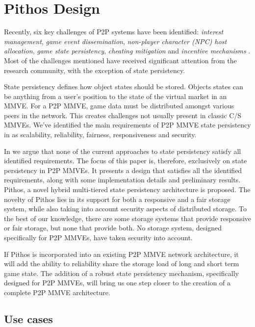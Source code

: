\chapter{Pithos Design}
\label{chp:DESIGN}

Recently, six key challenges of P2P systems have been identified: \emph{interest management}, \emph{game event dissemination}, \emph{non-player
character (NPC) host allocation}, \emph{game state persistency}, \emph{cheating mitigation} and \emph{incentive mechanisms}
\cite{Fan_deisgn_issues_p2p}. Most of the challenges mentioned have received significant attention from the research community, with the exception of
state persistency.

State persistency defines how object states should be stored. Objects states can be anything from a user's position to the state of the virtual
market in an MMVE. For a P2P MMVE, game data must be distributed amongst various peers in the network. This creates challenges not usually present in
classic C/S MMVEs. We've identified the main requirements of P2P MMVE state persistency in \cite{gilmore_p2p_mmog_state_persistency} as scalability,
reliability, fairness, responsiveness and security.

In \cite{gilmore_p2p_mmog_state_persistency} we argue that none of the current approaches to state persistency satisfy all identified requirements.
The focus of this paper is, therefore, exclusively on state persistency in P2P MMVEs. It presents a design that satisfies all the identified
requirements, along with some implementation details and preliminary results. Pithos, a novel hybrid multi-tiered state persistency architecture is
proposed. The novelty of Pithos lies in its support for both a responsive and a fair storage system, while also taking into account security aspects
of distributed storage. To the best of our knowledge, there are some storage systems that provide responsive or fair storage, but none that provide
both. No storage system, designed specifically for P2P MMVEs, have taken security into account.

If Pithos is incorporated into an existing P2P MMVE network architecture, it will add the ability to reliability share the storage load of long and
short term game state. The addition of a robust state persistency mechanism, specifically designed for P2P MMVEs, will bring us one step closer to
the creation of a complete P2P MMVE architecture.
    \section{Use cases}

